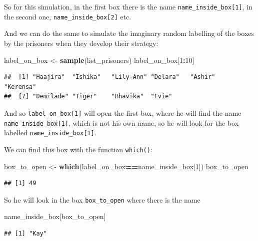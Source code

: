 \documentclass[]{book}
\newenvironment{Shaded}{\begin{snugshade}}{\end{snugshade}}
\newcommand{\DecValTok}[1]{\textcolor[rgb]{0.00,0.00,0.81}{#1}}
\newcommand{\KeywordTok}[1]{\textcolor[rgb]{0.13,0.29,0.53}{\textbf{#1}}}
\newcommand{\NormalTok}[1]{#1}
\newcommand{\OperatorTok}[1]{\textcolor[rgb]{0.81,0.36,0.00}{\textbf{#1}}}
\newcommand{\StringTok}[1]{\textcolor[rgb]{0.31,0.60,0.02}{#1}}
\begin{document}
So for this simulation, in the first box there is the name \texttt{name\_inside\_box{[}1{]}}, in the second one, \texttt{name\_inside\_box{[}2{]}} etc.

And we can do the same to simulate the imaginary random labelling of the boxes by the prisoners when they develop their strategy:

\begin{Shaded}
\begin{Highlighting}[]
\NormalTok{label_on_box <-}\StringTok{ }\KeywordTok{sample}\NormalTok{(list_prisoners)}
\NormalTok{label_on_box[}\DecValTok{1}\OperatorTok{:}\DecValTok{10}\NormalTok{]}
\end{Highlighting}
\end{Shaded}

\begin{verbatim}
##  [1] "Haajira"  "Ishika"   "Lily-Ann" "Delara"   "Ashir"    "Kerensa" 
##  [7] "Demilade" "Tiger"    "Bhavika"  "Evie"
\end{verbatim}

And so \texttt{label\_on\_box{[}1{]}} will open the first box, where he will find the name \texttt{name\_inside\_box{[}1{]}}, which is not his own name, so he will look for the box labelled \texttt{name\_inside\_box{[}1{]}}.

We can find this box with the function \texttt{which()}:

\begin{Shaded}
\begin{Highlighting}[]
\NormalTok{box_to_open <-}\StringTok{ }\KeywordTok{which}\NormalTok{(label_on_box}\OperatorTok{==}\NormalTok{name_inside_box[}\DecValTok{1}\NormalTok{]) }
\NormalTok{box_to_open}
\end{Highlighting}
\end{Shaded}

\begin{verbatim}
## [1] 49
\end{verbatim}

So he will look in the box \texttt{box\_to\_open} where there is the name

\begin{Shaded}
\begin{Highlighting}[]
\NormalTok{name_inside_box[box_to_open]}
\end{Highlighting}
\end{Shaded}

\begin{verbatim}
## [1] "Kay"
\end{verbatim}
\end{document}
